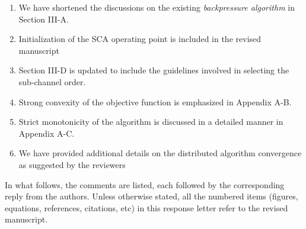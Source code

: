 \begin{enumerate}
\item We have shortened the discussions on the existing \textit{backpressure algorithm} in Section III-A.
\item Initialization of the \ac{SCA} operating point is included in the revised manuscript
\item Section III-D is updated to include the guidelines involved in selecting the sub-channel order.
\item Strong convexity of the objective function is emphasized in Appendix A-B.
\item Strict monotonicity of the algorithm is discussed in a detailed manner in Appendix A-C.
\item We have provided additional details on the distributed algorithm convergence as suggested by the reviewers
\end{enumerate}

In what follows, the comments are listed, each followed by the corresponding reply from the authors. Unless otherwise stated, all the numbered items (figures, equations, references, citations, etc) in this response letter refer to the revised manuscript.